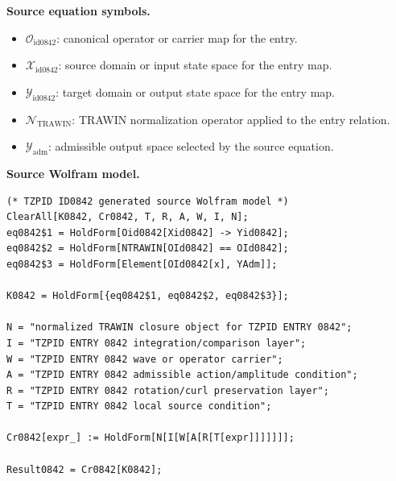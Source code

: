 \begin{minipage}[t]{0.49\linewidth}
\begingroup
\small
\raggedright
\textbf{Source equation symbols.}\par
\begin{itemize}[leftmargin=1.35em,itemsep=1pt,topsep=1pt,parsep=0pt]
    \item $\mathcal{O}_{\mathrm{id0842}}$: canonical operator or carrier map for the entry.
    \item $\mathcal{X}_{\mathrm{id0842}}$: source domain or input state space for the entry map.
    \item $\mathcal{Y}_{\mathrm{id0842}}$: target domain or output state space for the entry map.
    \item $\mathcal{N}_{\mathrm{TRAWIN}}$: TRAWIN normalization operator applied to the entry relation.
    \item $\mathcal{Y}_{\mathrm{adm}}$: admissible output space selected by the source equation.
\end{itemize}
\endgroup
\end{minipage}\hfill
\begin{minipage}[t]{0.47\linewidth}
\begingroup
\scriptsize
\raggedright
\textbf{Source Wolfram model.}\par
\begin{Verbatim}[fontsize=\tiny,breaklines=true,breakanywhere=true]
(* TZPID ID0842 generated source Wolfram model *)
ClearAll[K0842, Cr0842, T, R, A, W, I, N];
eq0842$1 = HoldForm[Oid0842[Xid0842] -> Yid0842];
eq0842$2 = HoldForm[NTRAWIN[OId0842] == OId0842];
eq0842$3 = HoldForm[Element[OId0842[x], YAdm]];

K0842 = HoldForm[{eq0842$1, eq0842$2, eq0842$3}];

N = "normalized TRAWIN closure object for TZPID ENTRY 0842";
I = "TZPID ENTRY 0842 integration/comparison layer";
W = "TZPID ENTRY 0842 wave or operator carrier";
A = "TZPID ENTRY 0842 admissible action/amplitude condition";
R = "TZPID ENTRY 0842 rotation/curl preservation layer";
T = "TZPID ENTRY 0842 local source condition";

Cr0842[expr_] := HoldForm[N[I[W[A[R[T[expr]]]]]]];

Result0842 = Cr0842[K0842];
\end{Verbatim}
\endgroup
\end{minipage}

